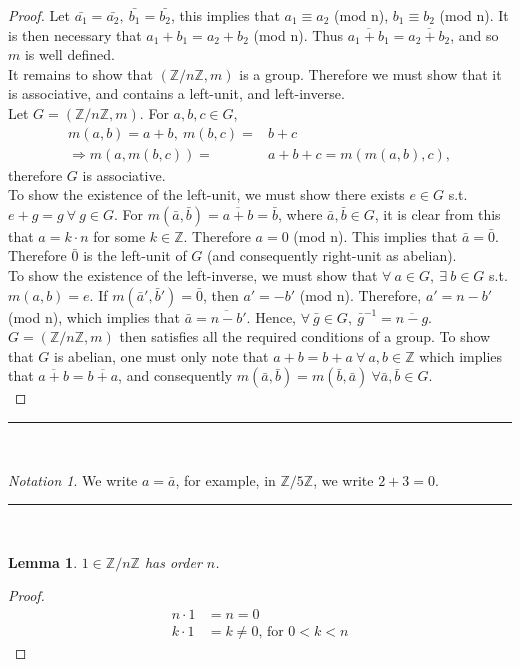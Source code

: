 \documentclass{article}
\newtheorem{lemma}[theorem]{Lemma}
\theoremstyle{definition}
\theoremstyle{remark}
\newtheorem*{notation}{Notation}
\begin{document}
\begin{proof}
	Let $\bar{a_1}=\bar{a_2},~\bar{b_1}=\bar{b_2}$, this implies that $a_1\equiv a_2 $ (mod n), $b_1\equiv b_2$ (mod n). It is then necessary that $a_1+b_1=a_2+b_2$ (mod n). Thus $\overline{a_1+b_1}=\overline{a_2+b_2}$, and so $m$ is well defined.\\
	\indent It remains to show that $(\mathbb{Z}/n\mathbb{Z},m)$ is a group. Therefore we must show that it is associative, and contains a left-unit, and left-inverse.\\
	\indent Let $G=(\mathbb{Z}/n\mathbb{Z},m)$. For $a,b,c\in G$,
	\begin{align*}
		m(a,b)=a+b, ~m(b,c)=     & b+c                \\
		\Rightarrow m(a,m(b,c))= & a+b+c=m(m(a,b),c),
	\end{align*}
	therefore $G$ is associative. \\ \indent To show the existence of the left-unit, we must show there exists $e\in G$ s.t. $e+g=g~\forall~g\in G$. For $m(\bar{a},\bar{b})=\overline{a+b}=\bar{b}$, where $\bar{a},\bar{b}\in G$, it is clear from this that $a=k\cdot n$ for some $k\in \mathbb{Z}$. Therefore $a=0$ (mod n). This implies that $\bar{a}=\bar{0}$. Therefore $\bar{0}$ is the left-unit of $G$ (and consequently right-unit as abelian).\\
	\indent To show the existence of the left-inverse, we must show that $\forall~a\in G, ~\exists ~ b\in G$ s.t. $m(a,b)=e$. If $m(\bar{a}',\bar{b}')=\bar{0}$, then $a'=-b'$ (mod n). Therefore, $a'=n-b'$ (mod n), which implies that $\bar{a}=\overline{n-b}'$. Hence, $\forall~\bar{g}\in G, ~\bar{g}^{-1}=\overline{n-g}$.\\
	\indent $G=(\mathbb{Z}/n\mathbb{Z},m) $ then satisfies all the required conditions of a  group. To show that $G$ is abelian, one must only note that $a+b=b+a~\forall ~ a,b\in \mathbb{Z}$ which implies that $\overline{a+b}=\overline{b+a}$, and consequently $m(\bar{a},\bar{b})=m(\bar{b},\bar{a})~\forall \bar{a},\bar{b}\in G$.\\
\end{proof}

\hrule
\vspace{2mm}~\\
\begin{notation}
	We write $a=\bar{a}$, for example, in $\mathbb{Z}/5\mathbb{Z}$, we write $2+3=0$.\\
\end{notation}

\hrule
\vspace{2mm}~\\
\begin{lemma}
	$1\in\mathbb{Z}/n\mathbb{Z}$ has order $n$.
\end{lemma}
\begin{proof}
	\begin{align*}
		n\cdot 1 & = n = 0                      \\
		k\cdot 1 & =k\neq 0 \text{, for } 0<k<n
	\end{align*}
\end{proof}
\end{document}
